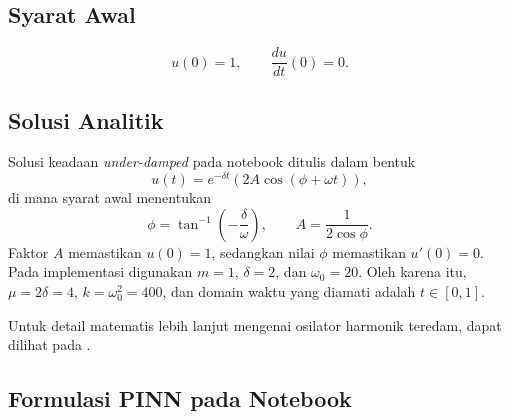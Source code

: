 \documentclass[12pt, letterpaper]{article}
\begin{document}
\subsection{Syarat Awal}
\begin{equation}
    u(0) = 1, \qquad \frac{du}{dt}(0) = 0.
\end{equation}

\subsection{Solusi Analitik}

Solusi keadaan \textit{under-damped} pada notebook ditulis dalam bentuk
\begin{equation}
    u(t)=e^{-\delta t}\left(2A\cos(\phi+\omega t)\right),
\end{equation}
di mana syarat awal menentukan
\begin{equation}
    \phi=\tan^{-1}\!\left(-\frac{\delta}{\omega}\right),
    \qquad
    A=\frac{1}{2\cos\phi}.
\end{equation}
Faktor $A$ memastikan $u(0)=1$, sedangkan nilai $\phi$ memastikan
$u'(0)=0$. Pada implementasi digunakan $m=1$, $\delta=2$, dan
$\omega_0=20$. Oleh karena itu, $\mu=2\delta=4$, $k=\omega_0^2=400$, dan
domain waktu yang diamati adalah $t\in[0,1]$.

Untuk detail matematis lebih lanjut mengenai osilator harmonik teredam,
dapat dilihat pada \cite{beltoforion}.

\subsection{Formulasi PINN pada Notebook}
\end{document}
